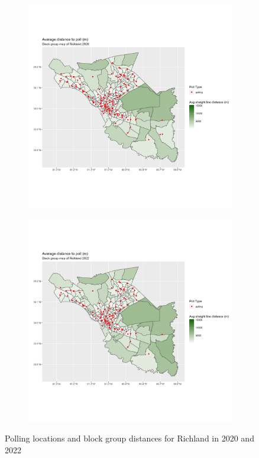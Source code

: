 \documentclass[11pt]{article}
\theoremstyle{remark}
\theoremstyle{definition}
\begin{document}
\begin{figure}
	\begin{subfigure}{.5\textwidth}
		\centering
		\includegraphics[width=\linewidth]{result analysis/Richland_SC_original_configs/distance_map_Richland_config_original_2020_polls.png}
		\label{sfig:York_2020_bg_dist}
	\end{subfigure} 
	\begin{subfigure}{.5\textwidth}
		\centering
		\includegraphics[width=\linewidth]{result analysis/Richland_SC_original_configs/distance_map_Richland_config_original_2022_polls.png}
		\label{sfig:Richland_2022_bg_dist}
	\end{subfigure}
	\caption{Polling locations and block group distances for Richland in 2020 and 2022}
	\label{fig:Richland distance maps}
\end{figure}
\end{document}
